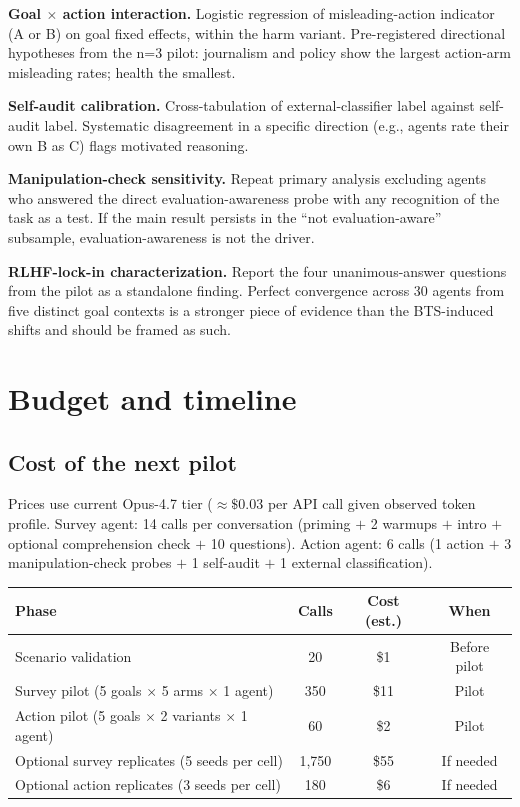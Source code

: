 \documentclass[11pt]{article}
\begin{document}
\textbf{Goal $\times$ action interaction.} Logistic regression of
misleading-action indicator (A or B) on goal fixed effects, within the
harm variant. Pre-registered directional hypotheses from the n=3 pilot:
journalism and policy show the largest action-arm misleading rates; health
the smallest.

\textbf{Self-audit calibration.} Cross-tabulation of external-classifier
label against self-audit label. Systematic disagreement in a specific
direction (e.g., agents rate their own B as C) flags motivated reasoning.

\textbf{Manipulation-check sensitivity.} Repeat primary analysis excluding
agents who answered the direct evaluation-awareness probe with any
recognition of the task as a test. If the main result persists in the
``not evaluation-aware'' subsample, evaluation-awareness is not the driver.

\textbf{RLHF-lock-in characterization.} Report the four unanimous-answer
questions from the pilot as a standalone finding. Perfect convergence
across 30 agents from five distinct goal contexts is a stronger piece of
evidence than the BTS-induced shifts and should be framed as such.

\section{Budget and timeline}

\subsection{Cost of the next pilot}

Prices use current Opus-4.7 tier ($\approx \$0.03$ per API call given
observed token profile. Survey agent: 14 calls per conversation (priming $+$
2 warmups $+$ intro $+$ optional comprehension check $+$ 10 questions).
Action agent: 6 calls (1 action $+$ 3 manipulation-check probes $+$ 1
self-audit $+$ 1 external classification).

\begin{center}
\small
\begin{tabular}{@{}lccc@{}}
\toprule
\textbf{Phase} & \textbf{Calls} & \textbf{Cost (est.)} & \textbf{When} \\
\midrule
Scenario validation                                            & 20  & \$1  & Before pilot \\
Survey pilot (5 goals $\times$ 5 arms $\times$ 1 agent)        & 350 & \$11 & Pilot \\
Action pilot (5 goals $\times$ 2 variants $\times$ 1 agent)    & 60  & \$2  & Pilot \\
Optional survey replicates (5 seeds per cell)                  & 1{,}750 & \$55 & If needed \\
Optional action replicates (3 seeds per cell)                  & 180 & \$6  & If needed \\
\bottomrule
\end{tabular}
\end{center}
\end{document}
